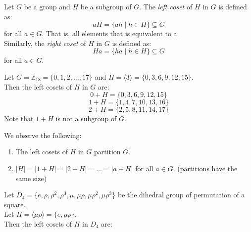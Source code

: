 
\begin{definition}
    Let $G$ be a group and $H$ be a subgroup of $G$. The \textit{left coset} of $H$ in $G$ is defined as:
    \[aH = \{ ah \mid h \in H \} \subseteq G\]
    for all $a \in G$. That is, all elements that is equivalent to a. \\
    Similarly, the \textit{right coset} of $H$ in $G$ is defined as:
    \[Ha = \{ ha \mid h \in H \} \subseteq G\]
    for all $a \in G$.\\
\end{definition}

\begin{eg}
    Let $G = \mathbb{Z}_{18} = \{0, 1, 2, \ldots, 17\}$ and $H = \langle 3 \rangle = \{0, 3, 6, 9, 12, 15\}$.\\
    Then the left cosets of $H$ in $G$ are: 
    \[0 + H = \{0, 3, 6, 9, 12, 15\}\]
    \[1 + H = \{1, 4, 7, 10, 13, 16\}\]
    \[2 + H = \{2, 5, 8, 11, 14, 17\}\]
    Note that $1 + H$ is not a subgroup of $G$.\\ 
\end{eg}

\begin{remark}
    We observe the following:
    \begin{enumerate}
        \item The left cosets of $H$ in $G$ partition $G$.
        \item $|H| = |1+H| = |2+H| = \ldots = |a+H|$ for all $a \in G$. (partitions have the same size)
    \end{enumerate}
\end{remark}

\begin{eg}
    Let $D_4 = \{e, \rho, \rho^2, \rho^3, \mu, \mu\rho, \mu\rho^2, \mu\rho^3\}$ be the dihedral group of permutation of a square.\\
    Let $H = \langle \mu \rho \rangle = \{e, \mu\rho\}$.\\
    Then the left cosets of $H$ in $D_4$ are: 
    \begin{center}
    \end{center}
\end{eg}

